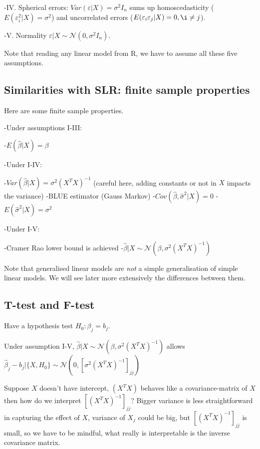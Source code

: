 \documentclass[
]{article}
\begin{document}
-IV. Spherical errors: \(Var(\varepsilon|X)=\sigma^2 I_n\) sums up
homoscedasticity (\(E(\varepsilon_i^2|X)=\sigma^2\)) and uncorrelated
errors (\(E(\varepsilon_i\varepsilon_j |X)=0,\i\neq j\)).

-V. Normality \(\varepsilon|X\sim\mathcal{N}(0,\sigma^2 I_n)\).

Note that reading any linear model from R, we have to assume all these
five assumptions.

\hypertarget{similarities-with-slr-finite-sample-properties}{%
\subsection{Similarities with SLR: finite sample
properties}\label{similarities-with-slr-finite-sample-properties}}

Here are some finite sample properties.

-Under assumptions I-III:

-\(E(\hat{\beta}|X)=\beta\)

-Under I-IV:

-\(Var(\hat{\beta}|X)=\sigma^2(X^T X)^{-1}\) (careful here, adding
constants or not in \(X\) impacts the variance) -BLUE estimator (Gauss
Markov) -\(Cov(\hat{\beta},\hat{\sigma}^2 |X)=0\)
-\(E(\hat{\sigma}^2|X)=\sigma^2\)

-Under I-V:

-Cramer Rao lower bound is achieved
-\(\hat{\beta}|X\sim\mathcal{N}(\beta,\sigma^2(X^T X)^{-1})\)

Note that generalised linear models are \emph{not} a simple
generalisation of simple linear models. We will see later more
extensively the differences between them.

\hypertarget{t-test-and-f-test}{%
\subsection{T-test and F-test}\label{t-test-and-f-test}}

Have a hypothesis test \(H_0 :\beta_j=b_j\).

Under assumption I-V,
\(\hat{\beta}|X\sim\mathcal{N}(\beta,\sigma^2(X^T X)^{-1})\) allows
\(\hat{\beta}_j-b_j|\{X, H_0\}\sim\mathcal{N}(0, [\sigma^2(X^T X)^{-1}]_{jj})\)

Suppose \(X\) doesn't have intercept, \((X^T X)\) behaves like a
covariance-matrix of \(X\) then how do we interpret
\([(X^T X)^{-1}]_{jj}\)? Bigger variance is less straightforward in
capturing the effect of \(X\), variance of \(X_j\) could be big, but
\([(X^T X)^{-1}]_{jj}\) is small, so we have to be mindful, what really
is interpretable is the inverse covariance matrix.
\end{document}
